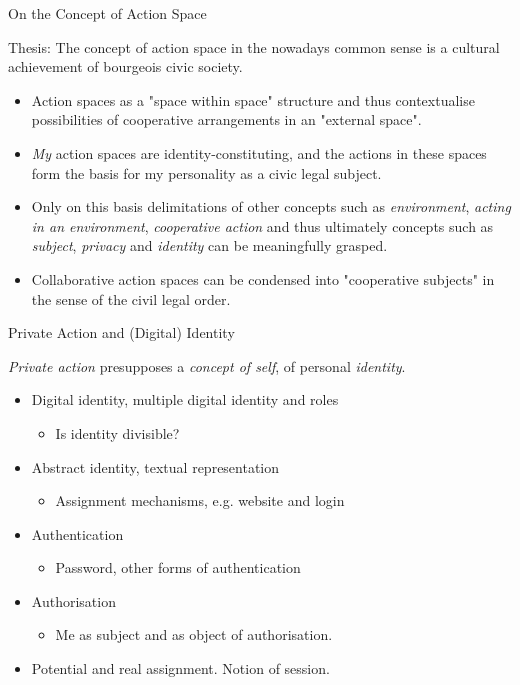 \documentclass{beamer}
\begin{document}
\begin{frame}{On the Concept of Action Space}
  \begin{block}{Thesis:}
    The concept of action space in the nowadays common sense is a cultural
    achievement of bourgeois civic society.
  \end{block}\small
\begin{itemize}
\item Action spaces as a "space within space" structure and thus contextualise
  possibilities of cooperative arrangements in an "external space".
\item \emph{My} action spaces are identity-constituting, and the actions in
  these spaces form the basis for my personality as a civic legal subject.
\item Only on this basis delimitations of other concepts such as
  \emph{environment}, \emph{acting in an environment}, \emph{cooperative
    action} and thus ultimately concepts such as \emph{subject},
  \emph{privacy} and \emph{identity} can be meaningfully grasped.
\item Collaborative action spaces can be condensed into "cooperative subjects"
  in the sense of the civil legal order.
\end{itemize}
\end{frame}
\begin{frame}{Private Action and (Digital) Identity}

\emph{Private action} presupposes a \emph{concept of self}, of personal
\emph{identity}.
\begin{itemize}
\item Digital identity, multiple digital identity and roles
  \begin{itemize}
  \item[] Is identity divisible?
  \end{itemize}
\item Abstract identity, textual representation
  \begin{itemize}
  \item[] Assignment mechanisms, e.g. website and login
  \end{itemize}
\item Authentication
  \begin{itemize}
  \item[] Password, other forms of authentication
  \end{itemize}
\item Authorisation
  \begin{itemize}
  \item[] Me as subject and as object of authorisation.
  \end{itemize}
\item Potential and real assignment. Notion of session.
\end{itemize}
\end{frame}
\end{document}
